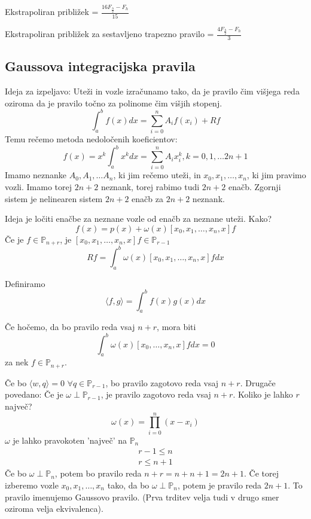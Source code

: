\documentclass[a4paper,12pt]{article}
\newcommand{\innerproduct}[2]{\langle #1, #2 \rangle}
\theoremstyle{definition}
\theoremstyle{remark}
\newcommand{\Pp}{\mathbb{P}}
\begin{document}
Ekstrapoliran približek = $\frac{16 F_{\frac{h}{2}} - F_h}{15}$

Ekstrapoliran približek za sestavljeno trapezno pravilo = $\frac{4 F_{\frac{h}{2}} - F_h}{3}$

\subsection{Gaussova integracijska pravila}
Ideja za izpeljavo: Uteži in vozle izračunamo tako, da je pravilo čim višjega reda oziroma da je pravilo točno za polinome čim višjih stopenj.
\begin{equation*}
    \int_{a}^{b} f(x) dx = \sum_{i=0}^{n} A_i f(x_i) + Rf
\end{equation*}
Temu rečemo metoda nedoločenih koeficientov:
\begin{equation*}
    f(x) = x^k
    \int_{a}^{b} x^k dx = \sum_{i=0}^{n} A_i x_i^k ,k = 0, 1, \dots 2n + 1
\end{equation*}
Imamo neznanke $A_0, A_1, \dots A_n$, ki jim rečemo uteži, in $x_0, x_1, \dots, x_n$, ki jim pravimo vozli. Imamo torej $2n + 2$ neznank, torej rabimo tudi $2n + 2$ enačb.
Zgornji sistem je nelinearen sistem $2n + 2$ enačb za $2n + 2$ neznank.

Ideja je ločiti enačbe za neznane vozle od enačb za neznane uteži. Kako?
\begin{equation*}
    f(x) = p(x) + \omega(x) [x_0, x_1, \dots, x_n, x] f
\end{equation*}
Če je $f \in \Pp_{n+r}$, je $[x_0, x_1, \dots, x_n, x] f \in \Pp_{r-1}$
\begin{equation*}
    Rf = \int_{a}^{b} \omega (x) [x_0, x_1, \dots, x_n, x] f dx
\end{equation*}

Definiramo 
\begin{equation*}
    \innerproduct{f}{g} = \int_{a}^{b} f(x) g(x) dx
\end{equation*}



Če hočemo, da bo pravilo reda vsaj $n+r$, mora biti
\begin{equation*}
    \int_{a}^{b} \omega (x) [x_0, \dots, x_n, x] f dx = 0
\end{equation*}
za nek $f \in \Pp_{n+r}$.

Če bo $\innerproduct{w}{q} = 0$ $\forall q \in \Pp_{r-1}$, bo pravilo zagotovo reda vsaj $n + r$. Drugače povedano: Če je $\omega \perp \Pp_{r-1}$,
je pravilo zagotovo reda vsaj $n + r$. Koliko je lahko $r$ največ?
\begin{equation*}
    \omega(x) = \prod_{i = 0}^{n} (x-x_i)
\end{equation*}
$\omega$ je lahko pravokoten 'največ' na $\Pp_n$
\begin{gather*}
    r - 1 \leq n \\
    r \leq n + 1
\end{gather*}
Če bo $\omega \perp \Pp_n$, potem bo pravilo reda $n+r = n + n + 1 = 2n + 1$. Če torej izberemo vozle $x_0, x_1, \dots, x_n$ tako, da bo $\omega \perp \Pp_n$,
potem je pravilo reda $2n + 1$. To pravilo imenujemo Gaussovo pravilo. (Prva trditev velja tudi v drugo smer oziroma velja ekvivalenca).
\end{document}
